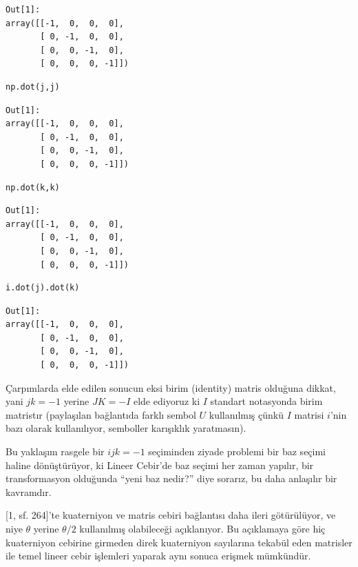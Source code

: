 \documentclass[12pt,fleqn]{article}\usepackage{../../common}
\begin{document}
\begin{verbatim}
Out[1]: 
array([[-1,  0,  0,  0],
       [ 0, -1,  0,  0],
       [ 0,  0, -1,  0],
       [ 0,  0,  0, -1]])
\end{verbatim}

\begin{verbatim}
np.dot(j,j)
\end{verbatim}

\begin{verbatim}
Out[1]: 
array([[-1,  0,  0,  0],
       [ 0, -1,  0,  0],
       [ 0,  0, -1,  0],
       [ 0,  0,  0, -1]])
\end{verbatim}

\begin{verbatim}
np.dot(k,k)
\end{verbatim}

\begin{verbatim}
Out[1]: 
array([[-1,  0,  0,  0],
       [ 0, -1,  0,  0],
       [ 0,  0, -1,  0],
       [ 0,  0,  0, -1]])
\end{verbatim}

\begin{verbatim}
i.dot(j).dot(k)
\end{verbatim}

\begin{verbatim}
Out[1]: 
array([[-1,  0,  0,  0],
       [ 0, -1,  0,  0],
       [ 0,  0, -1,  0],
       [ 0,  0,  0, -1]])
\end{verbatim}

Çarpımlarda elde edilen sonucun eksi birim (identity) matris olduğuna dikkat,
yani $jk = -1$ yerine $JK = -I$ elde ediyoruz ki $I$ standart notasyonda birim
matristır (paylaşılan bağlantıda farklı sembol $U$ kullanılmış çünkü $I$ matrisi
$i$'nin bazı olarak kullanılıyor, semboller karışıklık yaratmasın).

Bu yaklaşım rasgele bir $ijk=-1$ seçiminden ziyade problemi bir baz seçimi
haline dönüştürüyor, ki Lineer Cebir'de baz seçimi her zaman yapılır, bir
transformasyon olduğunda ``yeni baz nedir?'' diye sorarız, bu daha anlaşılır
bir kavramdır.

[1, sf. 264]'te kuaterniyon ve matris cebiri bağlantısı daha ileri götürülüyor,
ve niye $\theta$ yerine $\theta / 2$ kullanılmış olabileceği açıklanıyor.  Bu
açıklamaya göre hiç kuaterniyon cebirine girmeden direk kuaterniyon sayılarına
tekabül eden matrisler ile temel lineer cebir işlemleri yaparak aynı sonuca
erişmek mümkündür.
\end{document}
